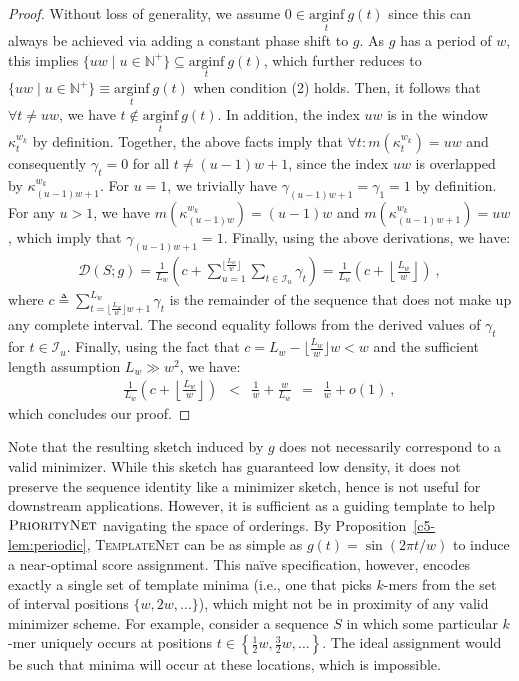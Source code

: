 \begin{proof}
Without loss of generality, we assume $0 \in \underset{t}{\mathrm{arginf}}\ g(t)$ since this can always be achieved via adding a constant phase shift to $g$. As $g$ has a period of $w$, this implies $\{uw \mid u \in \mathbb{N}^{+}\} \subseteq \underset{t}{\mathrm{arginf}}\ g(t)$, which further reduces to $\{uw \mid u \in \mathbb{N}^{+}\} \equiv \underset{t}{\mathrm{arginf}}\ g(t)$ when condition (2) holds. Then, it follows that $\forall t \neq uw$, we have $t \notin \underset{t}{\mathrm{arginf}}\ g(t)$. In addition, the index $uw$ is in the window $\kappa^{w_k}_{t}$ by definition. Together, the above facts imply that $\forall t: m(\kappa^{w_k}_{t}) = uw$ and consequently $\gamma_t = 0$ for all $t \neq (u-1)w + 1$, since the index $uw$ is overlapped by $\kappa^{w_k}_{(u-1)w + 1}$. For $u = 1$, we trivially have $\gamma_{(u-1)w + 1} = \gamma_1 = 1$ by definition. For any $u > 1$, we have $m(\kappa^{w_k}_{(u-1)w}) = (u-1)w$ and $m(\kappa^{w_k}_{(u-1)w + 1}) = uw$, which imply that $\gamma_{(u-1)w + 1} = 1$. Finally, using the above derivations, we have:
\begin{eqnarray}
\mathcal{D}(S; g) = \frac{1}{L_w}\left(c + \sum_{u=1}^{\lfloor\frac{L_w}{w}\rfloor}\sum_{t \in \mathcal{I}_u} \gamma_{t}  \right) =  \frac{1}{L_w}\left(c + \left\lfloor\frac{L_w}{w}\right\rfloor\right) \ ,
\end{eqnarray} 
where $c \triangleq \sum_{t=\lfloor\frac{L_w}{w}\rfloor w + 1}^{L_w} \gamma_t$ is the remainder of the sequence that does not make up any complete interval. The second equality follows from the derived values of $\gamma_t$ for $t \in \mathcal{I}_u$. Finally, using the fact that $c = L_w - \lfloor\frac{L_w}{w}\rfloor w< w$ and the sufficient length assumption $L_w \gg w^2$, we have:
\begin{eqnarray}
\frac{1}{L_w}\left(c + \left\lfloor\frac{L_w}{w}\right\rfloor\right) & < &  \frac{1}{w} + \frac{w}{L_w} \ \ = \ \ \frac{1}{w} + o(1) \ ,
\end{eqnarray} 
which concludes our proof.
\end{proof}

Note that the resulting sketch induced by $g$ does not necessarily correspond to a valid minimizer. While this sketch has guaranteed low density, it does not preserve the sequence identity like a minimizer sketch, hence is not useful for downstream applications. However, it is sufficient as a guiding template to help $\textsc{PriorityNet}$ navigating the space of orderings. By Proposition~\ref{c5-lem:periodic}, \textsc{TemplateNet} can be as simple as $g(t) = \sin(2\pi t/w)$ to induce a near-optimal score assignment. This na\"ive specification, however, encodes exactly a single set of template minima (i.e., one that picks $k$-mers from the set of interval positions $\{w, 2w, \dots\}$), which might not be in proximity of any valid minimizer scheme. For example, consider a sequence $S$ in which some particular $k$-mer uniquely occurs at positions $t \in \left\{\frac{1}{2}w, \frac{3}{2}w, \dots\right\}$. The ideal assignment would be such that minima will occur at these locations, which is impossible. 

